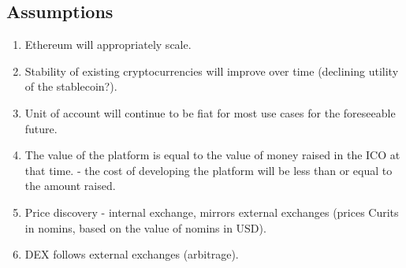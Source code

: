 \pagebreak
\subsection{Assumptions}

\begin{enumerate}
	\item Ethereum will appropriately scale.
	\item Stability of existing cryptocurrencies will improve over time (declining utility of the stablecoin?).
	\item Unit of account will continue to be fiat for most use cases for the foreseeable future.
	\item The value of the platform is equal to the value of money raised in the ICO at that time.
   - the cost of developing the platform will be less than or equal to the amount raised.
	\item Price discovery - internal exchange, mirrors external exchanges (prices Curits in nomins, based on the value of nomins in USD).
	\item DEX follows external exchanges (arbitrage).
\end{enumerate}

\pagebreak